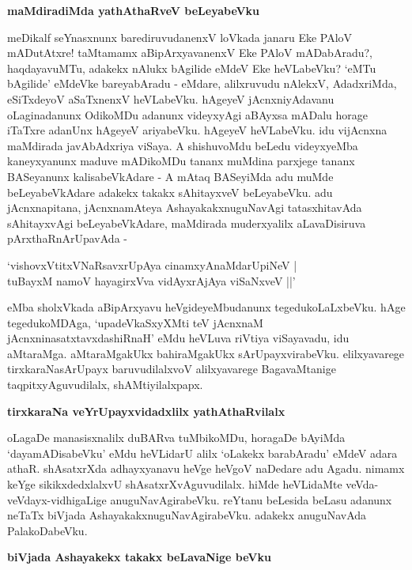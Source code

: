{\bigskip
\noindent
{\large\bf maMdiradiMda yathAthaRveV beLeyabeVku}}\label{page69}
\medskip

\noindent
meDikalf seYnasxnunx barediruvudanenxV loVkada janaru Eke PAloV mADutAtxre! taMtamamx aBipArxya\-vanenxV Eke PAloV mADabAradu?, haqdayavuMTu, adakekx nAlukx bAgilide eMdeV Eke heVLabeVku? `eMTu bAgilide' eMdeVke bareyabAradu - eMdare, alilxruvudu nAlekxV, AdadxriMda, eSiTxdeyoV aSaTxnenxV heVLabeVku. hAgeyeV jAcnxniyAdavanu oLaginadanunx OdikoMDu adanunx videyxyAgi aBAyxsa mADalu horage iTaTxre adanUnx hAgeyeV ariyabeVku. hAgeyeV heVLabeVku. idu vijAcnxna maMdi\-rada javAbAdx\-riya viSaya. A shishuvoMdu beLedu videyxyeMba kaneyxyanunx maduve mADikoMDu tananx muMdina\- parxjege tananx BASeyanunx kalisabeVkAdare - A mAtaq BASeyiMda adu muMde beLeya\-beVkAdare adakekx takakx sAhitayxveV beLeyabeVku. adu jAcnxnapitana, jAcnxnamAteya AshayakakxnuguNavAgi tatasxhitavAda sAhitayxvAgi beLeyabeVkAdare, maMdirada muderxyalilx aLavaDisiruva pArxthaRnArUpavAda -

\begin{shloka}
`vishovxVtitxVNaRsavxrUpAya cinamxyAnaMdarUpiNeV |\\\label{69}
tuBayxM namoV hayagirxVva vidAyxrAjAya viSaNxveV ||'
\end{shloka}

\noindent
eMba sholxVkada aBipArxyavu heVgideyeMbudanunx tegedukoLaLxbeVku. hAge tegedukoMDAga, `upa\-deVkaSxyXMti teV jAcnxnaM\label{69} jAcnxninasatxtavxdashiRnaH' eMdu heVLuva riVtiya viSayavadu, idu aMtaraMga. aMta\-raMgakUkx bahiraMgakUkx sArUpayxvirabeVku. elilxyavarege tirxkaraNasArUpayx baruvudilalxvoV alilxya\-varege BagavaMtanige taqpitxyAguvudilalx, shAMtiyilalxpapx.

{\bigskip
\noindent
{\large\bf tirxkaraNa veYrUpayxvidadxlilx yathAthaRvilalx}}\label{page69}
\medskip

\noindent
oLagaDe manasisxnalilx duBARva tuMbikoMDu, horagaDe bAyiMda `dayamADisa\-beVku' eMdu heVLi\-darU alilx `oLakekx barabAradu' eMdeV adara athaR. shAsatxrXda adhayxyanavu heVge heVgoV naDe\-dare adu Agadu. nimamx keYge sikikxdedxlalxvU shAsatxrXvAguvudilalx. hiMde heVLidaMte veVda-veVdayx-vidhigaLige anu\-guNa\-vAgira\-beVku. reYtanu beLesida beLasu adanunx neTaTx biVjada AshayakakxnuguNavAgirabeVku. adakekx anuguNa\-vAda PalakoDabeVku.

{\bigskip
\noindent
{\large\bf biVjada Ashayakekx takakx beLavaNige beVku}}\label{page70}
\medskip

